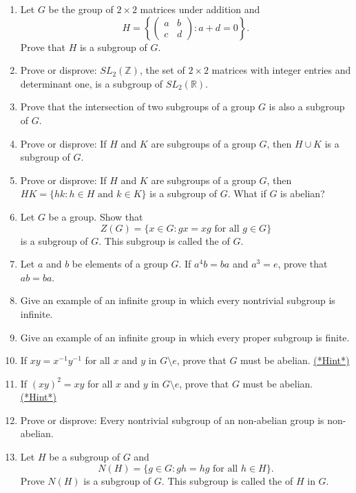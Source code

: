 {\begin{enumerate}
 
\item
Let $G$ be the group of $2 \times 2$ matrices under addition and
\[
H
=
\left\{
\begin{pmatrix}
a & b \\
c & d
\end{pmatrix}
:
a + d = 0
\right\}.
\]
Prove that $H$ is a subgroup of $G$.
 
 
\item
Prove or disprove: $SL_2( {\mathbb Z} )$, the set of $2 \times 2$
matrices with integer entries and determinant one, is a subgroup of
$SL_2( {\mathbb R} )$. 
 
  
\item\label{ex:eoc:31}
Prove that the intersection of two subgroups of a group $G$ is also a
subgroup of $G$. 
 
 
\item
Prove or disprove:  If $H$ and $K$ are subgroups of a group $G$, then
$H \cup K$ is a subgroup of $G$. 
 
 
\item
Prove or disprove: If $H$ and $K$ are subgroups of a group $G$, then
$H K = \{hk : h \in H \text{ and } k \in K \}$ is a subgroup of $G$.
What if $G$ is abelian? 
 
 
\item
Let $G$ be a group. Show that
\[
Z(G) = \{ x \in G : gx = xg \mbox{ for all $g \in G$}
\}\label{centerofagroup} 
\]
is a subgroup of $G$. This subgroup is called the  of $G$. 
 
 
\item
Let $a$ and $b$ be elements of a group $G$. If $a^4b=ba$ and $a^3=e$,
prove that $ab=ba$.
 
 
\item
Give an example of an infinite group in which every nontrivial
subgroup is infinite.
 
 
\item
Give an example of an infinite group in which every proper subgroup is
finite. 
 
 
\item \label{ex:groups:abelian_proof}
If $xy = x^{-1} y^{-1}$ for all $x$ and $y$ in $G \setminus {e}$, prove that $G$
must be abelian.
\hyperref[sec:groups:hints]{(*Hint*)}
 
 
\item \label{ex:groups:abelian_proof2}
If $(xy)^2 = xy$ for all $x$ and $y$ in $G \setminus {e}$, prove that $G$ must be
abelian.
\hyperref[sec:groups:hints]{(*Hint*)}
 
 
\item
Prove or disprove: Every nontrivial subgroup of an non-abelian group is
non-abelian.
 
 
\item
Let $H$ be a subgroup of $G$ and
\[
N(H) = \{ g \in G : gh = hg \mbox{ for all $h \in H$}  \}.
\]
Prove $N(H)$ is a subgroup of $G$.  This subgroup is called the  of $H$ in $G$. 
 
\end{enumerate}
}
 
